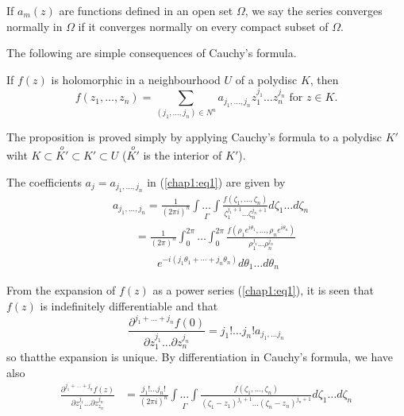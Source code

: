 If $a_m(z)$ are functions defined in an open set $\Omega$, we say the
series converges normally in $\Omega$ if it converges normally on
every compact subset of $\Omega$.

The following are simple consequences of Cauchy's formula.

\begin{proposition}\label{chap1:prop1}
If $f(z)$ is holomorphic in a neighbourhood $U$ of a polydisc $K$,
then 
\begin{equation*}
f(z_1,\ldots, z_n) = \sum\limits_{(j_1,\ldots, j_n) \in N^n}
a_{j_1,\ldots, j_n} z^{j_1}_1 \ldots z^{j_n}_n \text{ for } z \in
K. \tag{1}\label{chap1:eq1} 
\end{equation*}
\end{proposition}


\medskip
{}

The proposition is proved simply by applying Cauchy's formula to a
polydisc $K'$ wiht $K \subset \overset{o}{K'} \subset  K' \subset U$
($\overset{o}{K'}$ is the interior of $K'$). 

The coefficients $a_j = a_{j_1, \ldots, j_n}$ in (\ref{chap1:eq1}) are given by 
\begin{align*}
& a_{j_1, \ldots, j_n}  = \frac{1}{(2\pi i)^n}
\underset{\Gamma}{\int\ldots \int}
\frac{f(\zeta_1,\ldots,\zeta_n)}{\zeta_1^{j_1+1} \ldots
  \zeta_n^{j_n+1}} d \zeta_1 \ldots d \zeta_n\\
& \qquad = \frac{1}{(2\pi)^n} \int^{2\pi}_0 \ldots \int^{2\pi}_0 \frac{f(\rho_1
  e^{i\theta_1}, \ldots, \rho_n e^{i\theta_n})}{\rho_1^{j_1}\ldots
  \rho_n^{j_n}}\\
&\qquad\qquad e^{-i(j_1 \theta_1+ \cdots + j_n \theta_n)}
d\theta_{1} \ldots d\theta_n \tag{2} \label{chap1:eq2}
\end{align*}


From the expansion of $f(z)$ as a power series (\ref{chap1:eq1}), it is seen that
$f(z)$ is indefinitely differentiable and that 
\begin{equation*}
\frac{\partial^{j_1 + \ldots + j_n} f(0)}{\partial z^{j_1}_1 \ldots
  \partial z^{j_n}_n} = j _1 ! \ldots j_n ! a_{j_1,\ldots j_n} 
\end{equation*}
so that\pageoriginale the expansion is unique. By differentiation in
Cauchy's formula, we have also
{\fontsize{10}{12}\selectfont
\begin{align*}
\frac{\partial^{j_1 + \ldots + j_n} f(z)}{\partial z^{j_1}_{1} \ldots
  \partial z^{j_n}_{z_n}} &= \frac{j_1 ! \ldots j_n !}{(2\pi i)^n}
\underset{\Gamma}{\int\ldots \int} \frac{f(\zeta_1, \ldots,
  \zeta_n)}{(\zeta_1 - z_1)^{j_1+1} \ldots (\zeta_n - z_n)^{j_n+1}}  d
\zeta_1 \ldots d \zeta_n\tag{3}\label{chap1:eq3}
\end{align*}}\relax

